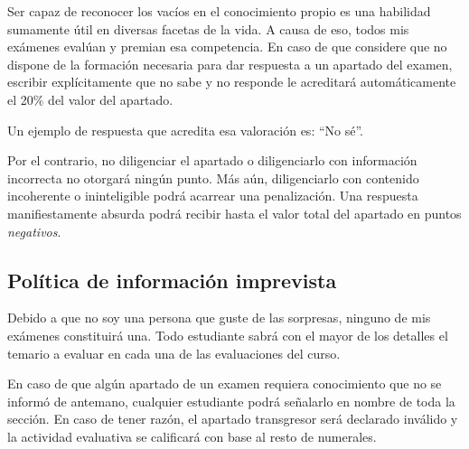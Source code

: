 Ser capaz de reconocer los vacíos en el conocimiento propio es una habilidad sumamente útil en diversas facetas de la vida. A causa de eso, todos mis exámenes evalúan y premian esa competencia. En caso de que considere que no dispone de la formación necesaria para dar respuesta a un apartado del examen, escribir explícitamente que no sabe y no responde le acreditará automáticamente el 20\% del valor del apartado.

Un ejemplo de respuesta que acredita esa valoración es: ``No sé''.

Por el contrario, no diligenciar el apartado o diligenciarlo con información incorrecta no otorgará ningún punto. Más aún, diligenciarlo con contenido incoherente o ininteligible podrá acarrear una penalización. Una respuesta manifiestamente absurda podrá recibir hasta el valor total del apartado en puntos \emph{negativos}.

\subsection{Política de información imprevista}
Debido a que no soy una persona que guste de las sorpresas, ninguno de mis exámenes constituirá una. Todo estudiante sabrá con el mayor de los detalles el temario a evaluar en cada una de las evaluaciones del curso.

En caso de que algún apartado de un examen requiera conocimiento que no se informó de antemano, cualquier estudiante podrá señalarlo en nombre de toda la sección. En caso de tener razón, el apartado transgresor será declarado inválido y la actividad evaluativa se calificará con base al resto de numerales.
